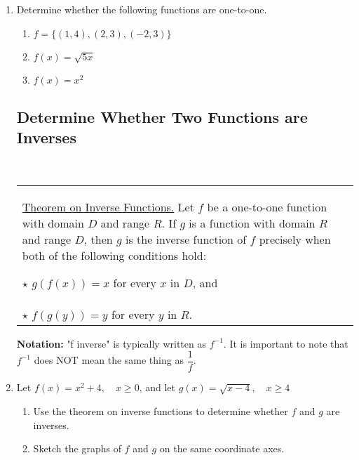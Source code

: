 \begin{enumerate}
\item Determine whether the following functions are one-to-one.
\begin{enumerate}
\item $f=\{(1,4), (2,3), (-2,3)\}$\\[.5in]

\item $f(x) = \sqrt{5x}$
\vfill
\item $f(x) = x^2$
\end{enumerate}
\vfill


\newpage


\subsection{Determine Whether Two Functions are Inverses} ~


\noindent \begin{tabular}{ | p{} |} \hline \noindent
\underline{Theorem on Inverse Functions.} Let $f$ be a one-to-one
function with domain $D$ and range $R$. If $g$ is a function with
domain $R$ and range $D$, then $g$ is the inverse function of $f$
precisely when both of the following conditions hold:

$ \star$ \quad $g(f(x))=x$ for every $x$ in $D$, and \\
$ \star$ \quad $f(g(y))=y$ for every $y$ in $R$.\\ \hline
\end{tabular} 

\noindent \textbf{Notation:} "f inverse" is typically written as
$f^{-1}$. It is important to note that $f^{-1}$ does NOT mean the same
thing as $\dfrac{1}{f}$.

\item Let $f(x) = x^2+4, \quad x \geq 0$, and let $g(x) = \sqrt{x-4}, \quad x \geq 4 $
\begin{enumerate}
\item Use the theorem on inverse functions to determine whether $f$
      and $g$ are inverses.

\vfill

\item Sketch the graphs of $f$ and $g$ on the same coordinate axes. \samepage \\
\end{enumerate}
\end{enumerate}
